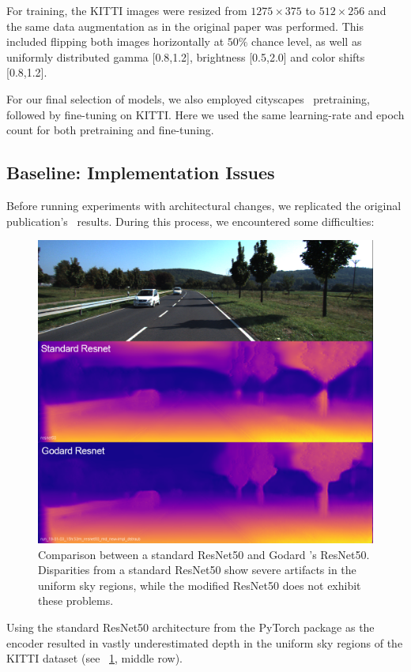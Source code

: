 For training, the KITTI images were resized from $1275\times375$ to $512\times256$ and the same data augmentation as in the original paper was performed. This included flipping both images horizontally at $50\%$ chance level, as well as uniformly distributed gamma [0.8,1.2], brightness [0.5,2.0] and color shifts [0.8,1.2]. 

For our final selection of models, we also employed cityscapes~\cite{Cordts2016Cityscapes} pretraining, followed by fine-tuning on KITTI. Here we used the same learning-rate and epoch count for both pretraining and fine-tuning.

\subsection{Baseline: Implementation Issues}
\label{sec:experiments:baseline}
Before running experiments with architectural changes, we replicated the original publication's~\cite{Godard_2017_CVPR} results. During this process, we encountered some difficulties:
\begin{figure}[t]
    \centering
    \includegraphics[width=0.8\linewidth]{images/disparities/implementationcomparison_001.png}
    \caption{Comparison between a standard ResNet50 and Godard \etal's ResNet50. Disparities from a standard ResNet50 show severe artifacts in the uniform sky regions, while the modified ResNet50 does not exhibit these problems.}
    \label{fig:sky_artifacts}
\end{figure}
Using the standard ResNet50 architecture from the PyTorch package as the encoder resulted in vastly underestimated depth in the uniform sky regions of the KITTI dataset (see \figurename~\ref{fig:sky_artifacts}, middle row).
